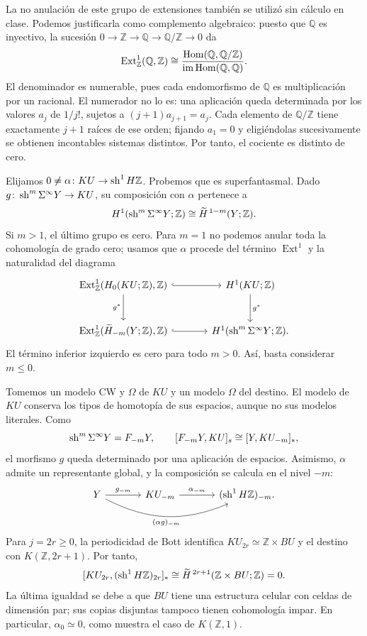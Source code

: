 \begin{nota}
La no anulación de este grupo de extensiones también se utilizó sin cálculo en clase. Podemos justificarla como complemento algebraico: puesto que $\mathbb Q$ es inyectivo, la sucesión $0\to\mathbb Z\to\mathbb Q\to\mathbb Q/\mathbb Z\to0$ da
\[
\operatorname{Ext}^1_{\mathbb Z}(\mathbb Q,\mathbb Z)
\cong\frac{\operatorname{Hom}(\mathbb Q,\mathbb Q/\mathbb Z)}{\operatorname{im}\operatorname{Hom}(\mathbb Q,\mathbb Q)}.
\]
El denominador es numerable, pues cada endomorfismo de $\mathbb Q$ es multiplicación por un racional. El numerador no lo es: una aplicación queda determinada por los valores $a_j$ de $1/j!$, sujetos a $(j+1)a_{j+1}=a_j$. Cada elemento de $\mathbb Q/\mathbb Z$ tiene exactamente $j+1$ raíces de ese orden; fijando $a_1=0$ y eligiéndolas sucesivamente se obtienen incontables sistemas distintos. Por tanto, el cociente es distinto de cero.
\end{nota}

Elijamos $0\ne\alpha\colon KU\to\operatorname{sh}^1H\mathbb Z$. Probemos que es superfantasmal. Dado $g\colon\operatorname{sh}^m\Sigma^\infty Y\to KU$, su composición con $\alpha$ pertenece a
\[
H^1(\operatorname{sh}^m\Sigma^\infty Y;\mathbb Z)
\cong\widetilde H^{\,1-m}(Y;\mathbb Z).
\]
Si $m>1$, el último grupo es cero. Para $m=1$ no podemos anular toda la cohomología de grado cero; usamos que $\alpha$ procede del término $\operatorname{Ext}^1$ y la naturalidad del diagrama
\[
\begin{tikzcd}[column sep=large,row sep=large]
\operatorname{Ext}^1_{\mathbb Z}(H_0(KU;\mathbb Z),\mathbb Z)
\arrow[r,hook]\arrow[d,"g^*"']
&H^1(KU;\mathbb Z)\arrow[d,"g^*"]\\
\operatorname{Ext}^1_{\mathbb Z}(\widetilde H_{-m}(Y;\mathbb Z),\mathbb Z)
\arrow[r,hook]&H^1(\sh^m\Sigma^\infty Y;\mathbb Z).
\end{tikzcd}
\]
El término inferior izquierdo es cero para todo $m>0$. Así, basta considerar $m\le0$.

Tomemos un modelo CW y $\Omega$ de $KU$ y un modelo $\Omega$ del destino. El modelo de $KU$ conserva los tipos de homotopía de sus espacios, aunque no sus modelos literales. Como
\[
\operatorname{sh}^m\Sigma^\infty Y=F_{-m}Y,
\qquad [F_{-m}Y,KU]_s\cong[Y,KU_{-m}]_*,
\]
el morfismo $g$ queda determinado por una aplicación de espacios. Asimismo, $\alpha$ admite un representante global, y la composición se calcula en el nivel $-m$:
\[
\begin{tikzcd}[column sep=large]
Y\arrow[r,"g_{-m}"]\arrow[rr,bend right=25,"(\alpha g)_{-m}"']
&KU_{-m}\arrow[r,"\alpha_{-m}"]&(\sh^1H\mathbb Z)_{-m}.
\end{tikzcd}
\]
Para $j=2r\ge0$, la periodicidad de Bott identifica $KU_{2r}\simeq\mathbb Z\times BU$ y el destino con $K(\mathbb Z,2r+1)$. Por tanto,
\[
[KU_{2r},(\operatorname{sh}^1H\mathbb Z)_{2r}]_*
\cong\widetilde H^{\,2r+1}(\mathbb Z\times BU;\mathbb Z)=0.
\]
La última igualdad se debe a que $BU$ tiene una estructura celular con celdas de dimensión par; sus copias disjuntas tampoco tienen cohomología impar. En particular, $\alpha_0\simeq0$, como muestra el caso de $K(\mathbb Z,1)$.

